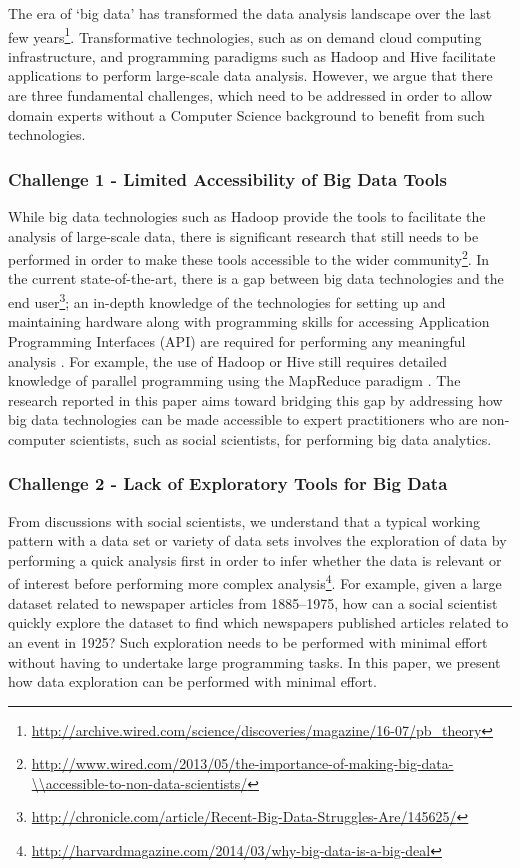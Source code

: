 \documentclass[10pt, conference, compsocconf]{IEEEtran}
\begin{document}
The era of `big data' \cite{definition} has transformed the data analysis landscape over the last few years\footnote{\url{http://archive.wired.com/science/discoveries/magazine/16-07/pb_theory}}. Transformative technologies, such as on demand cloud computing infrastructure, and programming paradigms such as Hadoop \cite{hadoop} and Hive \cite{hive-1} facilitate applications to perform large-scale data analysis. However, we argue that there are three fundamental challenges, which need to be addressed in order to allow domain experts without a Computer Science background to benefit from such technologies. 

\subsubsection*{Challenge 1 - Limited Accessibility of Big Data Tools}
While big data technologies such as Hadoop provide the tools to facilitate the analysis of large-scale data, there is significant research that still needs to be performed in order to make these tools accessible to the wider community\footnote{\url{http://www.wired.com/2013/05/the-importance-of-making-big-data-\\accessible-to-non-data-scientists/}}. In the current state-of-the-art, there is a gap between big data technologies and the end user\footnote{\url{http://chronicle.com/article/Recent-Big-Data-Struggles-Are/145625/}}; an in-depth knowledge of the technologies for setting up and maintaining hardware along with programming skills for accessing Application Programming Interfaces (API) are required for performing any meaningful analysis \cite{bigdata-1}. For example, the use of Hadoop or Hive still requires detailed knowledge of parallel programming using the MapReduce paradigm \cite{mapreduce-1, mapred-2}. The research reported in this paper aims toward bridging this gap by addressing how big data technologies can be made accessible to expert practitioners who are non-computer scientists, such as social scientists, for performing big data analytics. 

\subsubsection*{Challenge 2 - Lack of Exploratory Tools for Big Data} From discussions with social scientists, we understand that a typical working pattern with a data set or variety of data sets involves the exploration of data by performing a quick analysis first in order to infer whether the data is relevant or of interest before performing more complex analysis\footnote{\url{http://harvardmagazine.com/2014/03/why-big-data-is-a-big-deal}}. For example, given a large dataset related to newspaper articles from 1885--1975, how can a social scientist quickly explore the dataset to find which newspapers published articles related to an event in 1925? Such exploration needs to be performed with minimal effort without having to undertake large programming tasks. In this paper, we present how data exploration can be performed with minimal effort. 
\end{document}
